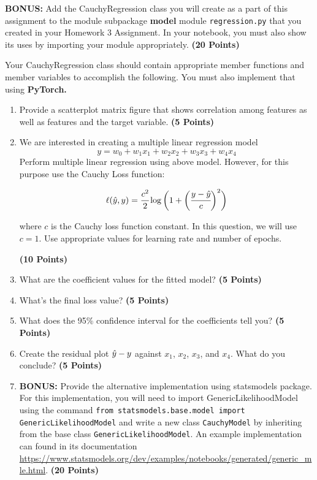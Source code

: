 \documentclass[12pt, xcolor=dvipsnames,svgnames,x11names]{article}
\makeatletter
\newenvironment{multiequation}[1][]{%
\begin{equation}%
   \begin{aligned}%
   \ifx#1\@empty\else\label{#1}\fi%
}{%
   \end{aligned}%
\end{equation}%
}
\makeatother
\begin{document}
\vspace{10pt}

\textbf{BONUS:} Add the CauchyRegression class you will create as a part of this assignment to the module subpackage \textbf{model}  module \texttt{regression.py} that you created in your Homework 3 Assignment. In your notebook, you must also show its uses by importing your module appropriately. \hfill \textbf{(20 Points)} 

Your CauchyRegression class should contain appropriate member functions and member variables to accomplish the following. You must also implement that using \textbf{PyTorch.}

\begin{enumerate}
    \item Provide a scatterplot matrix figure that shows correlation among features as well as features and the target variable. \hfill \textbf{(5 Points)}
    \item We are interested in creating a multiple linear regression model 
    $$
        y = w_0 + w_1 x_1 + w_2 x_2 + w_3 x_3 + w_4 x_4
    $$
    Perform multiple linear regression using above model. 
    However, for this purpose use the Cauchy Loss function:

    \begin{multiequation}
        \ell(\hat{y}, y) = \cfrac{c^2}{2} \log \bigg( 1 + \bigg( \cfrac{y-\yhat}{c}\bigg)^2 \bigg)
    \end{multiequation}

    where $c$ is the Cauchy loss function constant. In this question, we will use $c = 1$. Use appropriate values for learning rate and number of epochs.

    \hfill \textbf{(10 Points)}

    \item What are the coefficient values for the fitted model?  \textbf{(5 Points)}
    \item What's the final loss value?  \textbf{(5 Points)}
    \item What does the 95\% confidence interval for the coefficients tell you?  \textbf{(5 Points)}
    \item Create the residual plot ${\hat y} - y$  against $x_1$, $x_2$, $x_3$, and $x_4$. What do you conclude?  \textbf{(5 Points)}
    \item \textbf{BONUS:} Provide the alternative implementation using statsmodels package. For this implementation, you will need to import GenericLikelihoodModel using the command \texttt{from statsmodels.base.model import GenericLikelihoodModel} and write a new class \texttt{CauchyModel} by inheriting from the base class \texttt{GenericLikelihoodModel}. An example implementation can found in its documentation \url{https://www.statsmodels.org/dev/examples/notebooks/generated/generic_mle.html}. \hfill      \textbf{(20 Points)}
\end{enumerate}
\end{document}
